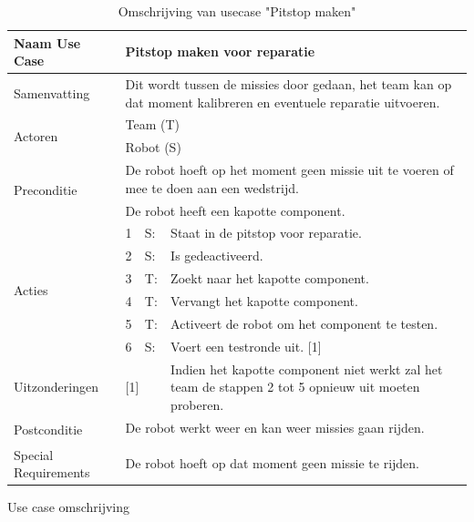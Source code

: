\documentclass[12pt]{article} %
\begin{document}
\begin{landscape}
\begin{table}[htbp]
  \centering
    \begin{tabular}{llll}
    \toprule
    Naam Use Case & \multicolumn{3}{l}{\textbf{Pitstop maken voor reparatie}} \\
    \midrule
    Samenvatting & \multicolumn{3}{l}{Dit wordt tussen de missies door gedaan, het team kan op dat moment kalibreren en eventuele reparatie uitvoeren.} \\
    \multirow{2}[1]{*}{Actoren} & \multicolumn{3}{l}{Team (T)} \\
          & \multicolumn{3}{l}{Robot (S)} \\
    \multirow{2}[1]{*}{Preconditie} & \multicolumn{3}{l}{De robot hoeft op het moment geen missie uit te voeren of mee te doen aan een wedstrijd.} \\
          & \multicolumn{3}{l}{De robot heeft een kapotte component.} \\
    \multirow{6}[11]{*}{Acties} & 1     & S:    & Staat in de pitstop voor reparatie. \\
          & 2     & S:    & Is gedeactiveerd. \\
          & 3     & T:    & Zoekt naar het kapotte component. \\
          & 4     & T:    & Vervangt het kapotte component. \\
          & 5     & T:    & Activeert de robot om het component te testen. \\
          & 6     & S:    & Voert een testronde uit. [1] \\
    Uitzonderingen & \multicolumn{2}{l}{[1]} & Indien het kapotte component niet werkt zal het team de stappen 2 tot 5 opnieuw uit moeten proberen. \\
    \multirow{2}[1]{*}{Postconditie} & \multicolumn{3}{l}{De robot werkt weer en kan weer missies gaan rijden.} \\
          & \multicolumn{3}{l}{} \\
    Special Requirements  & \multicolumn{3}{l}{De robot hoeft op dat moment geen missie te rijden.} \\
    \bottomrule
    \end{tabular}%
  \caption{Omschrijving van usecase "Pitstop maken"}
  \label{tab:addlabel3}%
\end{table}%
\clearpage
\begin{table}[htbp]
  \centering
  \caption{Use case omschrijving}

\end{table}
\end{landscape}
\end{document}
